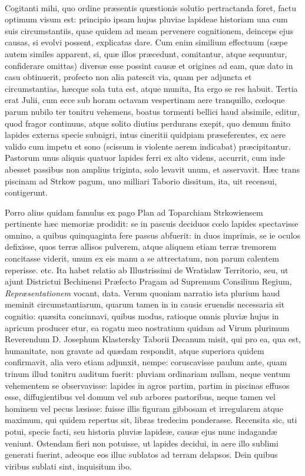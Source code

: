 \documentclass[a4paper, 11pt, oneside, polutonikogreek, latin]{article}
\begin{document}
\paragraph{}
Cogitanti mihi, quo ordine præsentis quæstionis solutio pertractanda foret, factu optimum visum est: principio ipsam hujus pluviae lapideae historiam una cum suis circumstantiis, quae quidem ad meam pervenere cognitionem, deinceps ejus causas, si evolvi possent, explicatas dare. Cum enim similium effectuum (sæpe autem similes apparent, si, quæ illos præcedunt, comitantur, atque sequuntur, confiderare omittas) diversæ esse possint causæ et origines ad eam, quæ dato in casu obtinuerit, profecto non alia patescit via, quam per adjuncta et circumstantias, hæcque sola tuta est, atque munita, Ita ergo se res habuit. Tertia erat Julii, cum ecce sub horam octavam vespertinam aere tranquillo, cœloque parum nubilo ter tonitru vehemens, boatus tormenti bellici haud absimile, editur, quod fragor continuus, atque solito diutius perdurans exepit, quo demum finito lapides externa specie subnigri, intus cineritii quidpiam præseferentes, ex aere valido cum impetu et sono (scissum is violente aerem indicabat) præcipitantur. Pastorum unus aliquis quatuor lapides ferri ex alto videns, accurrit, cum inde abesset passibus non amplius triginta, solo levavit unum, et asservavit. Hæc trans piscinam ad Strkow pagum, uno milliari Taborio dissitum, ita, uit recensui, contigerunt.

Porro alius quidam famulus ex pago Plan ad Toparchiam Strkowiensem pertinente hæc memoriæ prodidit: se in pascuis deciduos cœlo lapides spectavisse omnino, a quibus quinquaginta fere passus abfuerit: in duos imprimis, se ie oculos defixisse, quos terræ allisos pulverem, atque aliquem etiam terræ tremorem concitasse viderit, unum ex eis manu a se attrectatum, non parum calentem reperisse. etc. Ita habet relatio ab Illustrissimi de Wratislaw Territorio, seu, ut ajunt Districtui Bechinensi Præfecto Pragam ad Supremum Consilium Regium, \emph{Repræsentationem} vocant, data. Verum quoniam narratio ista plurium haud meminit circumstantiarum, quarum tamen in in causis eruendis necessaria sit cognitio: quæsita concinnavi, quibus modus, ratioque omnis pluviæ hujus in apricum producer etur, ea rogatu meo nostratium quidam ad Virum plurimum Reverendum D. Josephum Klastersky Taborii Decanum misit, qui pro ea, qua est, humanitate, non gravate ad quædam respondit, atque superiora quidem confirmavit, alia vero etiam adjunxit, nempe: coruscavisse paulum ante, quam trinum illud tonitru auditum fuerit: pluviam ordinariam nullam, neque ventum vehementem se observavisse: lapides in agros partim, partim in piscinas effusos esse, diffugientibus vel domum vel sub arbores pastoribus, neque tamen vel hominem vel pecus læsisse: fuisse illis figuram gibbosam et irregularem atque maximum, qui quidem repertus sit, libras tredecim ponderasse. Recensita sic, uti potui, specie facti, seu historia pluviæ lapideæ, causæ ejus nunc indagandæ veniunt. Ostendam fieri non potuisse, ut lapides decidui, in aere illo sublimi generati fuerint, adeoque eos illuc sublatos ad terram delapsos. Dein quibus viribus sublati sint, inquisitum ibo.
\clearpage
\end{document}
